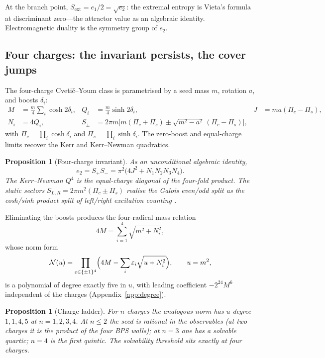 \documentclass[11pt,a4paper]{article}
\newtheorem{proposition}[theorem]{Proposition}
\theoremstyle{definition}
\theoremstyle{remark}
\begin{document}
At the branch point, \(S_{\mathrm{ext}}=e_1/2=\sqrt{e_2}\): the extremal entropy
is Vieta's formula at discriminant zero---the attractor value \cite{Moore} as
an algebraic identity. Electromagnetic duality is the symmetry group of
\(e_2\).

\subsection{Four charges: the invariant persists, the cover jumps}

The four-charge Cveti\v{c}--Youm class \cite{CY,Std4Q} is parametrised by a seed
mass \(m\), rotation \(a\), and boosts \(\delta_i\):
\begin{equation}
\begin{aligned}
M&=\frac{m}{4}\sum_i\cosh2\delta_i,&
Q_i&=\frac{m}{4}\sinh2\delta_i,&
J&=ma(\Pi_c-\Pi_s),\\
N_i&=4Q_i,&
S_\pm&=2\pi m\bigl[m(\Pi_c+\Pi_s)\pm\sqrt{m^2-a^2}\,(\Pi_c-\Pi_s)\bigr],
\end{aligned}
\label{eq:fourcharge}
\end{equation}
with \(\Pi_c=\prod_i\cosh\delta_i\) and \(\Pi_s=\prod_i\sinh\delta_i\). The
zero-boost and equal-charge limits recover the Kerr and Kerr--Newman
quadratics.

\begin{proposition}[Four-charge invariant]
\label{prop:crown}
As an unconditional algebraic identity,
\[
e_2=S_+S_-=\pi^2\bigl(4J^2+N_1N_2N_3N_4\bigr).
\]
The Kerr--Newman \(Q^4\) is the equal-charge diagonal of the four-fold product.
The static sectors \(S_{L,R}=2\pi m^2(\Pi_c\pm\Pi_s)\) realise the Galois
even/odd split as the cosh/sinh product split of left/right excitation
counting \cite{CL1,SV}.
\end{proposition}

Eliminating the boosts produces the four-radical mass relation
\begin{equation}
4M=\sum_{i=1}^{4}\sqrt{m^2+N_i^2},
\label{eq:massfiber}
\end{equation}
whose norm form
\begin{equation}
\mathcal N(u)=\prod_{\varepsilon\in\{\pm1\}^4}
\Bigl(4M-\sum_i\varepsilon_i\sqrt{u+N_i^2}\Bigr),
\qquad u=m^2,
\label{eq:norm}
\end{equation}
is a polynomial of degree exactly five in \(u\), with leading coefficient
\(-2^{24}M^6\) independent of the charges (Appendix~\ref{app:degree}).

\begin{proposition}[Charge ladder]
\label{prop:ladder}
For \(n\) charges the analogous norm has \(u\)-degree \(1,1,4,5\) at
\(n=1,2,3,4\). At \(n\le2\) the seed is rational in the observables (at two
charges it is the product of the four BPS walls); at \(n=3\) one has a solvable
quartic; \(n=4\) is the first quintic. The solvability threshold sits exactly at
four charges.
\end{proposition}
\end{document}
